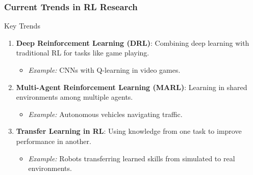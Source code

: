 \documentclass[aspectratio=169]{beamer}
\begin{document}
\begin{frame}[fragile]
    \frametitle{Current Trends in RL Research}
    \begin{block}{Key Trends}
        \begin{enumerate}
            \item \textbf{Deep Reinforcement Learning (DRL)}: Combining deep learning with traditional RL for tasks like game playing.
                \begin{itemize}
                    \item \textit{Example:} CNNs with Q-learning in video games.
                \end{itemize}
            \item \textbf{Multi-Agent Reinforcement Learning (MARL)}: Learning in shared environments among multiple agents.
                \begin{itemize}
                    \item \textit{Example:} Autonomous vehicles navigating traffic.
                \end{itemize}
            \item \textbf{Transfer Learning in RL}: Using knowledge from one task to improve performance in another.
                \begin{itemize}
                    \item \textit{Example:} Robots transferring learned skills from simulated to real environments.
                \end{itemize}
        \end{enumerate}
    \end{block}
\end{frame}
\end{document}
